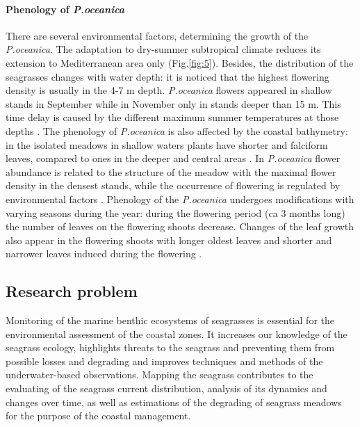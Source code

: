 \documentclass[11pt]{article}
\begin{document}
\paragraph{Phenology of \textit{P.oceanica}}
There are several environmental factors, determining the growth of the \textit{P.oceanica}. 
The adaptation
to dry-summer subtropical climate reduces its extension to Mediterranean area only (Fig.\ref{fig:5}).
Besides, the distribution of the seagrasses changes with water depth: it is noticed \cite{Dural10}\label{Dural10} that
the highest flowering density is usually in the 4-7 m depth. 
\textit{P.oceanica} flowers appeared in shallow
stands in September while in November only in stands deeper than 15 m. This time delay is caused by
the different maximum summer temperatures at those depths \cite{Buia91}\label{Buia91}.
The phenology of \textit{P.oceanica} is also affected by the coastal bathymetry: in the isolated meadows in shallow waters plants have shorter and falciform leaves, compared to ones in the deeper and central
areas \cite{Dural10}\label{Dural10}. In \textit{P.oceanica} flower abundance is related to the structure of the meadow with
the maximal flower density in the densest stands, while the occurrence of flowering is regulated by
environmental factors \cite{Buia91}\label{Buia91}. Phenology of the \textit{P.oceanica} undergoes 
modifications with varying seasons during the year: during the flowering period (ca 3 months long)
the number of leaves on the flowering shoots decrease. Changes of the leaf growth also appear in the
flowering shoots with longer oldest leaves and shorter and narrower leaves induced during the
flowering \cite{Gobert01}\label{Gobert01}.

\subsection{Research problem}
Monitoring of the marine benthic ecosystems of seagrasses is essential for the environmental
assessment of the coastal zones. It increases our knowledge of the seagrass ecology, highlights 
threats to the seagrass and preventing them from possible losses and degrading and improves
techniques and methods of the underwater-based observations. Mapping the seagrass contributes to
the evaluating of the seagrass current distribution, analysis of its dynamics and changes over time, as
well as estimations of the degrading of seagrass meadows for the purpose of the coastal management.
\end{document}
